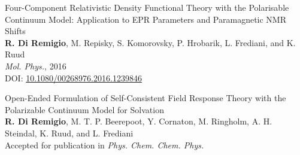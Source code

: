 \begin{description}[leftmargin=2mm, style=nextline]
\item[\paper{IV}]
  \small{\textsf{
  Four-Component Relativistic Density Functional Theory with the
  Polarisable Continuum Model: Application to EPR Parameters
  and Paramagnetic NMR Shifts
  }
  \\
  \textbf{R. Di Remigio}, M. Repisky, S. Komorovsky, P. Hrobarik, L.
  Frediani, and K. Ruud
  \\
  \textit{Mol. Phys.}, \textrm{2016}
  \\
  DOI: \href{http://dx.doi.org/10.1080/00268976.2016.1239846}{10.1080/00268976.2016.1239846}
  }
\label{pcmepr}

\item[\paper{V}]
  {\small\textsf{
  Open-Ended Formulation of Self-Consistent Field Response Theory with
  the Polarizable Continuum Model for Solvation
  }
  \\
  \textbf{R. Di Remigio}, M. T. P. Beerepoot, Y. Cornaton, M. Ringholm,
  A. H. Steindal, K. Ruud, and L. Frediani
  \\
  Accepted for publication in \textit{Phys. Chem. Chem. Phys.}
  }
\label{pcmopenrsp}
\end{description}
\renewcommand{\descriptionlabel}[1]{\hspace*{\labelsep}\spacedlowsmallcaps{#1}}

